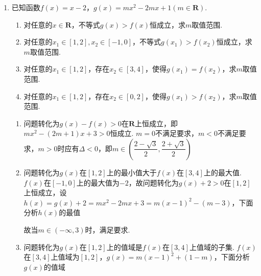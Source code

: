\begin{enumerate}
    \item 已知函数$f(x) = x - 2$，$g(x) = mx^2-2mx+1(m \in \mathbf{R})$. 
    \begin{enumerate}
        \item 对任意的$x \in \mathbf{R}$，不等式$g(x) > f(x)$恒成立，求$m$取值范围.
        \item 对任意的$x_1 \in [1, 2], x_2 \in [-1, 0]$，不等式$g(x_1) > f(x_2)$恒成立，求$m$取值范围.
        \item 对任意的$x_1 \in [1, 2]$，存在$x_2 \in [3, 4]$，使得$g(x_1) = f(x_2)$，求$m$取值范围.
        \item 对任意的$x_1 \in [1, 2]$，存在$x_2 \in [0, 2]$，使得$g(x_1) > f(x_2)$，求$m$取值范围.
    \end{enumerate}
    
    \begin{jieda}
        \begin{enumerate}
            \item 问题转化为$g(x) - f(x) > 0$在$\mathbf{R}$上恒成立，即$mx^2-(2m+1)x+3 > 0$恒成立. $m = 0$不满足要求，$m < 0$不满足要求，$m > 0$时应有$\Delta < 0$，即$m \in \left(\dfrac{2-\sqrt{3}}{2}, \dfrac{2+\sqrt{3}}{2}\right)$
            \item 问题转化为$g(x)$在$[1, 2]$上的最小值大于$f(x)$在$[3, 4]$上的最大值. $f(x)$在$[-1, 0]$上的最大值为$-2$，故问题转化为$g(x) + 2 > 0$在$[1, 2]$上恒成立，设$h(x) = g(x) + 2 = mx^2-2mx + 3 = m(x-1)^2-(m-3)$，下面分析$h(x)$的最值
            故当$m \in (-\infty, 3)$时，满足要求.
            \item 问题转化为$g(x)$在$[1, 2]$上的值域是$f(x)$在$[3, 4]$上值域的子集. $f(x)$在$[3, 4]$上值域为$[1, 2]$，$g(x) = m(x-1)^2 + (1-m)$，下面分析$g(x)$的值域
\end{enumerate}
\end{jieda}
\end{enumerate}

